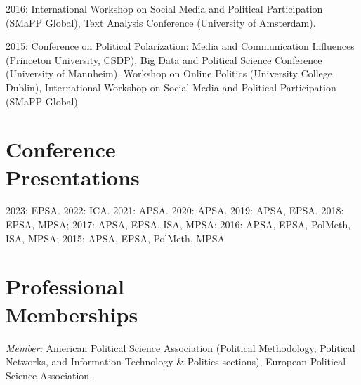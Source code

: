 \documentclass[margin,line,11pt]{resume}
\newcommand{\nl}{\vspace{0.10in}\\}
\begin{document}
\begin{resume}
2016: International Workshop on Social Media and Political Participation (SMaPP Global), Text Analysis Conference (University of Amsterdam).

2015: Conference on Political Polarization: Media and Communication Influences (Princeton University, CSDP), Big Data and Political Science Conference (University of Mannheim), Workshop on Online Politics (University College Dublin), International Workshop on Social Media and Political Participation (SMaPP Global)

        \section{\mysidestyle Conference\\Presentations}
        
2023: EPSA. 2022: ICA. 2021: APSA. 2020: APSA. 2019: APSA, EPSA. 2018: EPSA, MPSA; 2017: APSA, EPSA, ISA, MPSA; 2016: APSA, EPSA, PolMeth, ISA, MPSA; 2015: APSA, EPSA, PolMeth, MPSA


\section{\mysidestyle Professional\\Memberships}

\emph{Member:} American Political Science Association (Political Methodology, Political Networks, and Information Technology \& Politics sections), European Political Science Association.


   
    
    

\end{resume}
\end{document}
